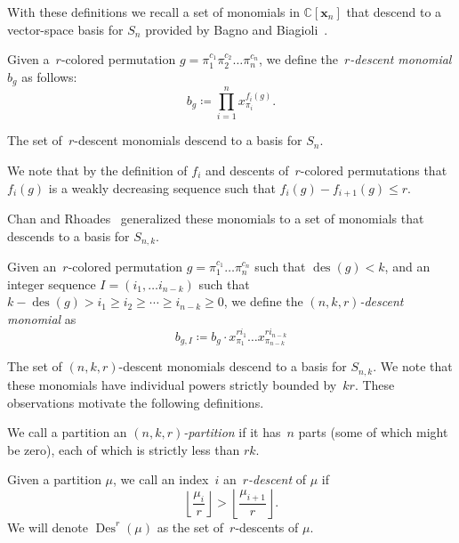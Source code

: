 \documentclass[ALCO,ThmDefs,Unicode,epreuves]{cedram}
\DeclareMathOperator{\Des}{Des}
\DeclareMathOperator{\des}{des}
\begin{document}
With these definitions we recall a set of monomials in $\mathbb{C}[\mathbf{x}_n]$ that descend to a vector-space basis for 
$S_n$ provided by Bagno and Biagioli~\cite{BB}.

	\begin{defi}

		Given a~$r$-colored permutation $g=\pi_1^{c_1}\pi_2^{c_2}\ldots \pi_n^{c_n}$, we define the~\emph{$r$-descent 
monomial} $b_g$ as follows:
\begin{equation}
b_g\coloneqq \prod_{i=1}^n x^{f_i(g)}_{\pi_i}.
\end{equation}
	\end{defi}

	The set of~$r$-descent monomials descend to a basis for $S_n$.

We note that by the definition of $f_i$ and descents of~$r$-colored permutations that $f_i(g)$ is a weakly decreasing sequence 
such that $f_i(g)-f_{i+1}(g)\leq r$. 

Chan and Rhoades~\cite{CR} generalized these monomials to a set of monomials that descends to a basis for $S_{n,k}$.

	\begin{defi}

		Given an~$r$-colored permutation $g=\pi_1^{c_1}\ldots \pi_n^{c_n}$ such that $\des (g)<k$, and an integer sequence 
$I=(i_1, \ldots i_{n-k})$ such that $k-\des (g)>i_1\geq i_2\geq\cdots\geq i_{n-k} \geq 0$, we define the 
\emph{$(n,k,r)$-descent monomial} as
\begin{equation}
b_{g,I}\coloneqq b_g\cdot x^{ri_1}_{\pi_1}\ldots 
x^{ri_{n-k}}_{\pi_{n-k}}
\end{equation}
	\end{defi} 

	The set of $(n,k,r)$-descent monomials descend to a basis for $S_{n,k}$.
	We note that these monomials have individual powers strictly bounded by~$kr$. These observations motivate the following 
definitions. 

\begin{defi}

	We call a partition an \emph{$(n,k,r)$-partition} if it has~$n$ parts \textup{(}some of which might be zero\textup{)}, 
each of which is strictly less than $rk$.

\end{defi}

\begin{defi}
	Given a partition $\mu$, we call an index~$i$ an~\emph{$r$-descent} of $\mu$ if
\begin{equation}
\left\lfloor 
\frac{\mu_i}{r}\right\rfloor>\left\lfloor \frac{\mu_{i+1}}{r}\right\rfloor.
\end{equation}
We will denote $\Des ^r(\mu)$ as the set of~$r$-descents of $\mu$.
\end{defi}
\end{document}

